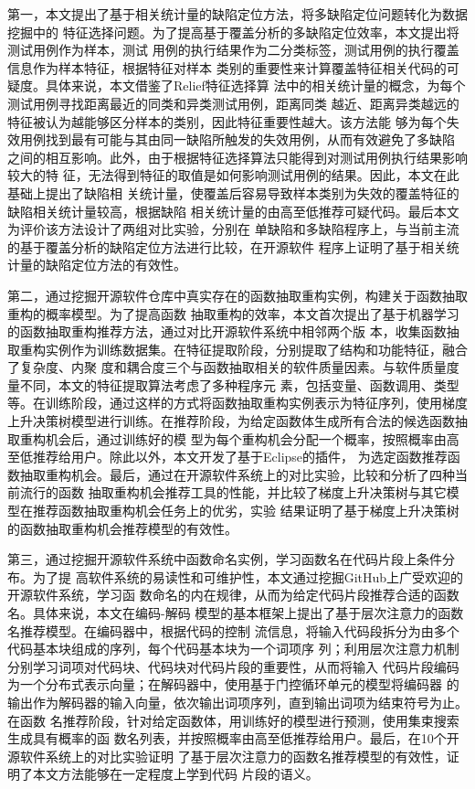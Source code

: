 第一，本文提出了基于相关统计量的缺陷定位方法，将多缺陷定位问题转化为数据挖掘中的
特征选择问题。为了提高基于覆盖分析的多缺陷定位效率，本文提出将测试用例作为样本，测试
用例的执行结果作为二分类标签，测试用例的执行覆盖信息作为样本特征，根据特征对样本
类别的重要性来计算覆盖特征相关代码的可疑度。具体来说，本文借鉴了Relief特征选择算
法中的相关统计量的概念，为每个测试用例寻找距离最近的同类和异类测试用例，距离同类
越近、距离异类越远的特征被认为越能够区分样本的类别，因此特征重要性越大。该方法能
够为每个失效用例找到最有可能与其由同一缺陷所触发的失效用例，从而有效避免了多缺陷
之间的相互影响。此外，由于根据特征选择算法只能得到对测试用例执行结果影响较大的特
征，无法得到特征的取值是如何影响测试用例的结果。因此，本文在此基础上提出了缺陷相
关统计量，使覆盖后容易导致样本类别为失效的覆盖特征的缺陷相关统计量较高，根据缺陷
相关统计量的由高至低推荐可疑代码。最后本文为评价该方法设计了两组对比实验，分别在
单缺陷和多缺陷程序上，与当前主流的基于覆盖分析的缺陷定位方法进行比较，在开源软件
程序上证明了基于相关统计量的缺陷定位方法的有效性。

第二，通过挖掘开源软件仓库中真实存在的函数抽取重构实例，构建关于函数抽取重构的概率模型。为了提高函数
抽取重构的效率，本文首次提出了基于机器学习的函数抽取重构推荐方法，通过对比开源软件系统中相邻两个版
本，收集函数抽取重构实例作为训练数据集。在特征提取阶段，分别提取了结构和功能特征，融合了复杂度、内聚
度和耦合度三个与函数抽取相关的软件质量因素。与软件质量度量不同，本文的特征提取算法考虑了多种程序元
素，包括变量、函数调用、类型等。在训练阶段，通过这样的方式将函数抽取重构实例表示为特征序列，使用梯度
上升决策树模型进行训练。在推荐阶段，为给定函数体生成所有合法的候选函数抽取重构机会后，通过训练好的模
型为每个重构机会分配一个概率，按照概率由高至低推荐给用户。除此以外，本文开发了基于Eclipse的插件，
为选定函数推荐函数抽取重构机会。最后，通过在开源软件系统上的对比实验，比较和分析了四种当前流行的函数
抽取重构机会推荐工具的性能，并比较了梯度上升决策树与其它模型在推荐函数抽取重构机会任务上的优劣，实验
结果证明了基于梯度上升决策树的函数抽取重构机会推荐模型的有效性。

第三，通过挖掘开源软件系统中函数命名实例，学习函数名在代码片段上条件分布。为了提
高软件系统的易读性和可维护性，本文通过挖掘GitHub上广受欢迎的开源软件系统，学习函
数命名的内在规律，从而为给定代码片段推荐合适的函数名。具体来说，本文在编码-解码
模型的基本框架上提出了基于层次注意力的函数名推荐模型。在编码器中，根据代码的控制
流信息，将输入代码段拆分为由多个代码基本块组成的序列，每个代码基本块为一个词项序
列；利用层次注意力机制分别学习词项对代码块、代码块对代码片段的重要性，从而将输入
代码片段编码为一个分布式表示向量；在解码器中，使用基于门控循环单元的模型将编码器
的输出作为解码器的输入向量，依次输出词项序列，直到输出词项为结束符号为止。在函数
名推荐阶段，针对给定函数体，用训练好的模型进行预测，使用集束搜索生成具有概率的函
数名列表，并按照概率由高至低推荐给用户。最后，在10个开源软件系统上的对比实验证明
了基于层次注意力的函数名推荐模型的有效性，证明了本文方法能够在一定程度上学到代码
片段的语义。

